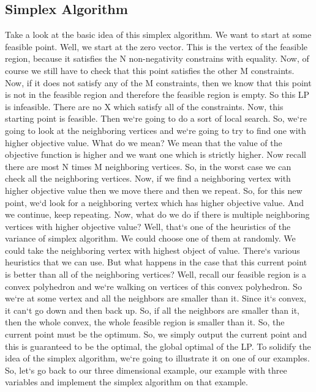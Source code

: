 \subsection{Simplex Algorithm}
Take a look at the basic idea of this simplex algorithm.
We want to start at some feasible point.
Well, we start at the zero vector.
This is the vertex of the feasible region, because it satisfies the N non-negativity constrains with equality.
Now, of course we still have to check that this point satisfies the other M constraints.
Now, if it does not satisfy any of the M constraints, then we know that this point is not in the feasible region and therefore the feasible region is empty.
So this LP is infeasible.
There are no X which satisfy all of the constraints.
Now, this starting point is feasible.
Then we`re going to do a sort of local search.
So, we`re going to look at the neighboring vertices and we`re going to try to find one with higher objective value.
What do we mean? We mean that the value of the objective function is higher and we want one which is strictly higher.
Now recall there are most N times M neighboring vertices.
So, in the worst case we can check all the neighboring vertices.
Now, if we find a neighboring vertex with higher objective value then we move there and then we repeat.
So, for this new point, we`d look for a neighboring vertex which has higher objective value.
And we continue, keep repeating.
Now, what do we do if there is multiple neighboring vertices with higher objective value? Well, that`s one of the heuristics of the variance of simplex algorithm.
We could choose one of them at randomly.
We could take the neighboring vertex with highest object of value.
There`s various heuristics that we can use.
But what happens in the case that this current point is better than all of the neighboring vertices? Well, recall our feasible region is a convex polyhedron and we`re walking on vertices of this convex polyhedron.
So we`re at some vertex and all the neighbors are smaller than it.
Since it`s convex, it can`t go down and then back up.
So, if all the neighbors are smaller than it, then the whole convex, the whole feasible region is smaller than it.
So, the current point must be the optimum.
So, we simply output the current point and this is guaranteed to be the optimal, the global optimal of the LP\@.
To solidify the idea of the simplex algorithm, we`re going to illustrate it on one of our examples.
So, let`s go back to our three dimensional example, our example with three variables and implement the simplex algorithm on that example.

